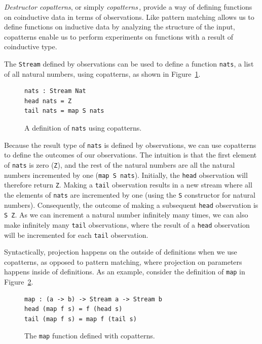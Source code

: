 \emph{Destructor copatterns}, or simply
\emph{copatterns}\,\citep{Abel13Copatterns}, provide a way of defining functions
on coinductive data in terms of observations. Like pattern matching allows us to
define functions on inductive data by analyzing the structure of the input,
copatterns enable us to perform experiments on functions with a result of
coinductive type.

The \texttt{Stream} defined by observations can be used to define a function
\texttt{nats}, a list of all natural numbers, using copatterns, as shown in
Figure~\ref{fig:nats_copatterns}.


\begin{figure}[h]
\begin{lstlisting}[mathescape]
nats : Stream Nat
head nats = Z
tail nats = map S nats
\end{lstlisting}
\caption{A definition of \texttt{nats} using copatterns.}
\label{fig:nats_copatterns}
\end{figure}

Because the result type of \texttt{nats} is defined by observations, we can use
copatterns to define the outcomes of our observations. The intuition is that the
first element of \texttt{nats} is zero (\texttt{Z}), and the rest of the natural
numbers are all the natural numbers incremented by one (\texttt{map S
  nats}). Initially, the \texttt{head} observation will therefore return
\texttt{Z}. Making a \texttt{tail} observation results in a new stream where all
the elements of \texttt{nats} are incremented by one (using the \texttt{S}
constructor for natural numbers). Consequently, the outcome of making a
subsequent \texttt{head} observation is \texttt{S Z}. As we can increment a
natural number infinitely many times, we can also make infinitely many
\texttt{tail} observations, where the result of a \texttt{head} observation will
be incremented for each \texttt{tail} observation. 

Syntactically, projection happens on the outside of definitions when we use
copatterns, as opposed to pattern matching, where projection on parameters
happens inside of definitions. As an example, consider the definition of
\texttt{map} in Figure~\ref{fig:map_copatterns}.

\begin{figure}[h]
\begin{lstlisting}[mathescape]
map : (a -> b) -> Stream a -> Stream b
head (map f s) = f (head s)
tail (map f s) = map f (tail s)
\end{lstlisting}
\caption{The \texttt{map} function defined with copatterns.}
\label{fig:map_copatterns}
\end{figure}

